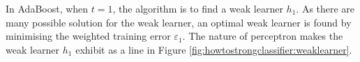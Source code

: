In AdaBoost, when $t=1$, the algorithm is to find a weak learner $h_{1}$. As there are many possible solution for the weak learner, an optimal weak learner is found by minimising the weighted training error $\varepsilon_{1}$. The nature of perceptron makes the weak learner $h_{1}$ exhibit as a line in \mbox{Figure} \ref{fig:howtostrongclassifier:weaklearner}.
\begin{figure}
\begin{center}

\end{center}
\end{figure}

